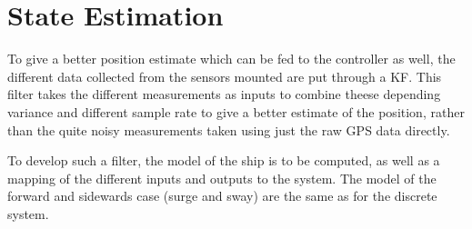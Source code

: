 \chapter{State Estimation}
To give a better position estimate which can be fed to the controller as well, the different data collected from the sensors mounted are put through a \ac{KF}. This filter takes the different measurements as inputs to combine theese depending variance and different sample rate to give a better estimate of the position, rather than the quite noisy measurements taken using just the raw \ac{GPS} data directly.

To develop such a filter, the model of the ship is to be computed, as well as a mapping of the different inputs and outputs to the system. The model of the forward and sidewards case (surge and sway) are the same as for the discrete system. 

